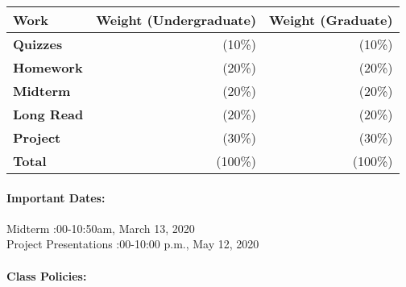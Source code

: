 \documentclass[11pt, a4paper]{article}
\begin{document}
\begin{table}[h]
\begin{tabularx}{\textwidth}{Xrr}
        \textbf{Work} & \textbf{Weight (Undergraduate)} & \textbf{Weight (Graduate)} \\
\hline
\textbf{Quizzes}         & (10\%)   & (10\%)\\
\textbf{Homework}        & (20\%)   & (20\%)\\
\textbf{Midterm}         & (20\%)   & (20\%)\\
\textbf{Long Read}       & (20\%)   & (20\%)\\
\textbf{Project}         & (30\%)   & (30\%)\\
\hline
\textbf{Total}           & (100\%) & (100\%)\\
\end{tabularx}
\end{table}

\paragraph{Important Dates:}
\begin{center} \begin{minipage}{3.8in}
\begin{flushleft}
Midterm      :00-10:50am, March 13, 2020\\
Project Presentations       :00-10:00 p.m., May 12, 2020\\
\end{flushleft}
\end{minipage}
\end{center}



\paragraph{Class Policies:}
\end{document}
